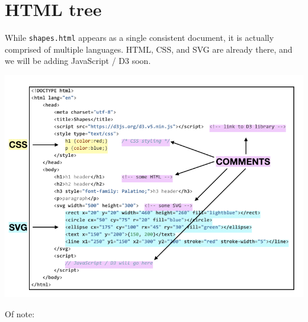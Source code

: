 \documentclass[openany]{book}
\begin{document}
\hypertarget{html-tree}{%
\section{HTML tree }\label{html-tree}}

While \texttt{shapes.html} appears as a single consistent document, it is actually comprised of multiple languages. HTML, CSS, and SVG are already there, and we will be adding JavaScript / D3 soon.

\begin{center}\includegraphics[width=1\linewidth]{images/shapes} \end{center}

Of note:
\end{document}

